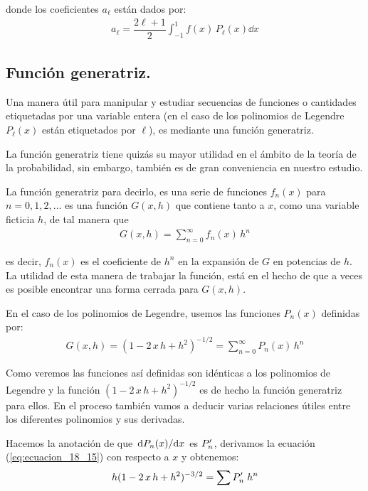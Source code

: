 donde los coeficientes $a_{\ell}$ están dados por:
\begin{align}
a_{\ell} = \dfrac{2 \ell + 1}{2} \int_{-1}^{1} f(x) \, P_{\ell} (x) \dd{x}
\label{eq:ecuacion_18_14}
\end{align}

\subsection{Función generatriz.}

Una manera útil para manipular y estudiar secuencias de funciones o cantidades etiquetadas por una variable entera (en el caso de los polinomios de Legendre $P_{\ell} (x)$ están etiquetados por $\ell$), es mediante una función generatriz. 
\par
La función generatriz tiene quizás su mayor utilidad en el ámbito de la teoría de la probabilidad, sin embargo, también es de gran conveniencia en nuestro estudio.
\par
La función generatriz para decirlo, es una serie de funciones $f_{n} (x)$ para $n = 0, 1, 2,\ldots$ es una función $G (x, h)$ que contiene tanto a $x$, como una variable ficticia $h$, de tal manera que
\begin{align*}
G(x,h) = \sum_{n=0}^{\infty} f_{n} (x) \, h^{n}
\end{align*}

es decir, $f_{n}(x)$ es el coeficiente de $h^{n}$ en la expansión de $G$ en potencias de $h$. La utilidad de esta manera de trabajar la función, está en el hecho de que a veces es posible encontrar una forma cerrada para $G(x, h)$.
\par
En el caso de los polinomios de Legendre, usemos las funciones $P_{n}(x)$ definidas por:
\begin{align}
G(x ,h) = (1 - 2 \, x \, h + h^{2})^{-1/2} =  \sum_{n=0}^{\infty} P_{n}(x) \, h^{n}
\label{eq:ecuacion_18_15}
\end{align}

Como veremos las funciones así definidas son idénticas a los polinomios de Legendre y la función $(1 - 2 \, x \, h + h^{2})^{-1/2}$ es de hecho la función generatriz para ellos. En el proceso también vamos a deducir varias relaciones útiles entre los diferentes polinomios y sus derivadas.
\par
Hacemos la anotación de que $\dv*{P_{n}(x)}{x}$ es ${P}^{\prime}_{n}$, derivamos la ecuación (\ref{eq:ecuacion_18_15}) con respecto a $x$ y obtenemos:
\begin{align}
h (1 - 2 \, x \, h + h^{2})^{-3/2} = \sum {P}^{\prime}_{n} \; h^{n}
\label{eq:ecuacion_18_16}
\end{align}

